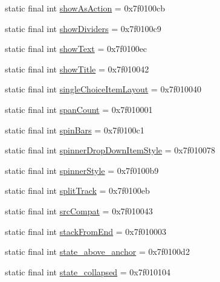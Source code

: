 \begin{CompactItemize}
static final int \hyperlink{classandroid_1_1support_1_1v7_1_1mediarouter_1_1_r_1_1attr_b6d1cde681e130f2256fdf78b83a95dd}{showAsAction} = 0x7f0100cb
\item 
static final int \hyperlink{classandroid_1_1support_1_1v7_1_1mediarouter_1_1_r_1_1attr_2d983b639c9f03592f7f06a9b01404ba}{showDividers} = 0x7f0100c9
\item 
static final int \hyperlink{classandroid_1_1support_1_1v7_1_1mediarouter_1_1_r_1_1attr_9be3f05d65d37db12515c34d84d7b346}{showText} = 0x7f0100ec
\item 
static final int \hyperlink{classandroid_1_1support_1_1v7_1_1mediarouter_1_1_r_1_1attr_1b81661a6c4c8ce6ab72a758d4468636}{showTitle} = 0x7f010042
\item 
static final int \hyperlink{classandroid_1_1support_1_1v7_1_1mediarouter_1_1_r_1_1attr_2a19b802039a35fb76bdc389a8b759b9}{singleChoiceItemLayout} = 0x7f010040
\item 
static final int \hyperlink{classandroid_1_1support_1_1v7_1_1mediarouter_1_1_r_1_1attr_c0b073e18c1b13155d0b408b6eaa1868}{spanCount} = 0x7f010001
\item 
static final int \hyperlink{classandroid_1_1support_1_1v7_1_1mediarouter_1_1_r_1_1attr_59d102b3cc98d1dd1b971a14fb0e12d8}{spinBars} = 0x7f0100c1
\item 
static final int \hyperlink{classandroid_1_1support_1_1v7_1_1mediarouter_1_1_r_1_1attr_2b89ef57d3b9792b385719f3c942f4bd}{spinnerDropDownItemStyle} = 0x7f010078
\item 
static final int \hyperlink{classandroid_1_1support_1_1v7_1_1mediarouter_1_1_r_1_1attr_a62abe571bba60d264a256371d2579eb}{spinnerStyle} = 0x7f0100b9
\item 
static final int \hyperlink{classandroid_1_1support_1_1v7_1_1mediarouter_1_1_r_1_1attr_5f8a7fb3d0ca330f243e807c6892d69a}{splitTrack} = 0x7f0100eb
\item 
static final int \hyperlink{classandroid_1_1support_1_1v7_1_1mediarouter_1_1_r_1_1attr_5589cebe774f1a61b20c589ed625b407}{srcCompat} = 0x7f010043
\item 
static final int \hyperlink{classandroid_1_1support_1_1v7_1_1mediarouter_1_1_r_1_1attr_bcef09ddc6e59415907bac65a2a49887}{stackFromEnd} = 0x7f010003
\item 
static final int \hyperlink{classandroid_1_1support_1_1v7_1_1mediarouter_1_1_r_1_1attr_f9d7abb22d2bcae138fe42b84b39f121}{state\_\-above\_\-anchor} = 0x7f0100d2
\item 
static final int \hyperlink{classandroid_1_1support_1_1v7_1_1mediarouter_1_1_r_1_1attr_12c7c10db54862d00021d68e01f3c39f}{state\_\-collapsed} = 0x7f010104

\end{CompactItemize}
